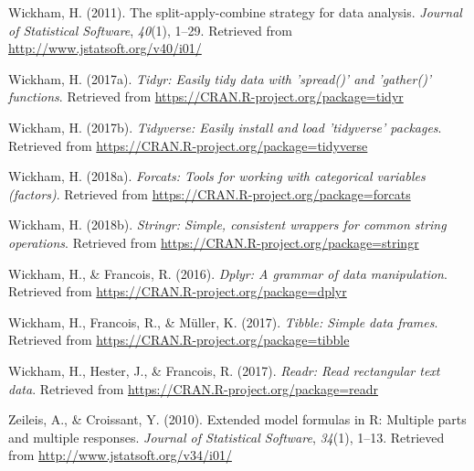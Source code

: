 \documentclass[english,man]{apa6}
\theoremstyle{definition}
\theoremstyle{definition}
\theoremstyle{definition}
\theoremstyle{remark}
\begin{document}
\hypertarget{ref-R-plyr}{}
Wickham, H. (2011). The split-apply-combine strategy for data analysis.
\emph{Journal of Statistical Software}, \emph{40}(1), 1--29. Retrieved
from \url{http://www.jstatsoft.org/v40/i01/}

\hypertarget{ref-R-tidyr}{}
Wickham, H. (2017a). \emph{Tidyr: Easily tidy data with 'spread()' and
'gather()' functions}. Retrieved from
\url{https://CRAN.R-project.org/package=tidyr}

\hypertarget{ref-R-tidyverse}{}
Wickham, H. (2017b). \emph{Tidyverse: Easily install and load
'tidyverse' packages}. Retrieved from
\url{https://CRAN.R-project.org/package=tidyverse}

\hypertarget{ref-R-forcats}{}
Wickham, H. (2018a). \emph{Forcats: Tools for working with categorical
variables (factors)}. Retrieved from
\url{https://CRAN.R-project.org/package=forcats}

\hypertarget{ref-R-stringr}{}
Wickham, H. (2018b). \emph{Stringr: Simple, consistent wrappers for
common string operations}. Retrieved from
\url{https://CRAN.R-project.org/package=stringr}

\hypertarget{ref-R-dplyr}{}
Wickham, H., \& Francois, R. (2016). \emph{Dplyr: A grammar of data
manipulation}. Retrieved from
\url{https://CRAN.R-project.org/package=dplyr}

\hypertarget{ref-R-tibble}{}
Wickham, H., Francois, R., \& Müller, K. (2017). \emph{Tibble: Simple
data frames}. Retrieved from
\url{https://CRAN.R-project.org/package=tibble}

\hypertarget{ref-R-readr}{}
Wickham, H., Hester, J., \& Francois, R. (2017). \emph{Readr: Read
rectangular text data}. Retrieved from
\url{https://CRAN.R-project.org/package=readr}

\hypertarget{ref-R-Formula}{}
Zeileis, A., \& Croissant, Y. (2010). Extended model formulas in R:
Multiple parts and multiple responses. \emph{Journal of Statistical
Software}, \emph{34}(1), 1--13. Retrieved from
\url{http://www.jstatsoft.org/v34/i01/}
\end{document}

